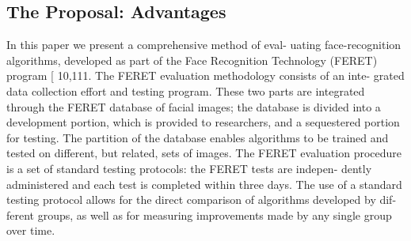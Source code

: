 \subsection{The Proposal: Advantages}
In this paper we present a comprehensive method of eval-
uating face-recognition
algorithms, developed as part of the
Face Recognition Technology (FERET) program [ 10,111.
The FERET evaluation methodology consists of an inte-
grated data collection effort and testing program. These
two parts are integrated through the FERET database of
facial images; the database is divided into a development
portion, which is provided to researchers, and a sequestered
portion for testing. The partition of the database enables
algorithms to be trained and tested on different, but related,
sets of images. The FERET evaluation procedure is a set of
standard testing protocols: the FERET tests are indepen-
dently administered
and each test is completed within
three days. The use of a standard testing protocol allows
for the direct comparison of algorithms developed by dif-
ferent groups, as well as for measuring improvements made
by any single group over time.


